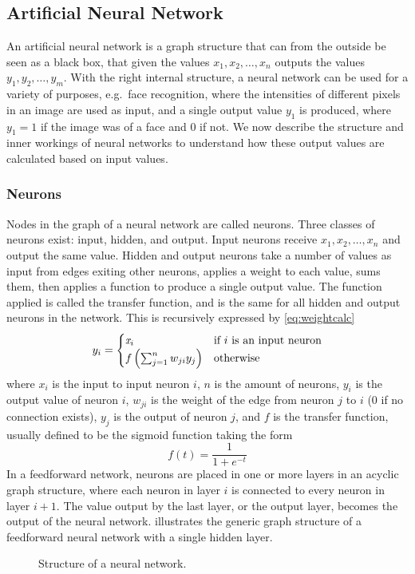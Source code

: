 \subsection{Artificial Neural Network}
An artificial neural network is a graph structure that can from the outside be seen as a black box, that given the values $x_1, x_2, \dots, x_n$ outputs the values $y_1, y_2, \dots, y_m$. With the right internal structure, a neural network can be used for a variety of purposes, e.g.\ face recognition, where the intensities of different pixels in an image are used as input, and a single output value $y_1$ is produced, where $y_1 = 1$ if the image was of a face and $0$ if not. We now describe the structure and inner workings of neural networks to understand how these output values are calculated based on input values.

\subsubsection{Neurons}
Nodes in the graph of a neural network are called neurons. Three classes of neurons exist: input, hidden, and output. Input neurons receive $x_1, x_2, \dots, x_n$ and output the same value. Hidden and output neurons take a number of values as input from edges exiting other neurons, applies a weight to each value, sums them, then applies a function to produce a single output value. The function applied is called the transfer function, and is the same for all hidden and output neurons in the network. This is recursively expressed by \cref{eq:weightcalc}
\begin{equation}\label{eq:weightcalc}
  y_i =
  \begin{cases}
    \var{x}_i & \text{if } i \text{ is an input neuron} \\
    f\left(\sum_{j=1}^n w_{ji} y_{j} \right) & \text{otherwise} %
  \end{cases}
\end{equation}
where $x_i$ is the input to input neuron $i$, $n$ is the amount of neurons, $y_i$ is the output value of neuron $i$, $w_{ji}$ is the weight of the edge from neuron $j$ to $i$ ($0$ if no connection exists), $y_j$ is the output of neuron $j$, and $f$ is the transfer function, usually defined to be the sigmoid function taking the form
\begin{equation*}
  f(t) = \frac{1}{1+e^{-t}}
\end{equation*}
%
In a feedforward network, neurons are placed in one or more layers in an acyclic graph structure, where each neuron in layer $i$ is connected to every neuron in layer $i + 1$. The value output by the last layer, or the output layer, becomes the output of the neural network.  illustrates the generic graph structure of a feedforward neural network with a single hidden layer.
%
\begin{figure}[htpb]
  \centering
  
  \caption{Structure of a neural network.}
  \label{fig:ann}
\end{figure}
%
